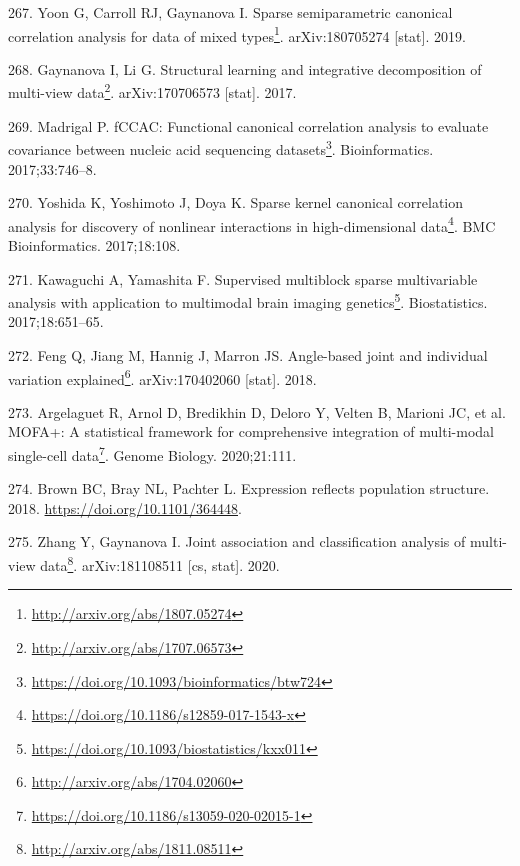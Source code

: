 \documentclass[
  a4paper,
]{book}
\DeclareRobustCommand{\href}[2]{#2\footnote{\url{#1}}}
\newlength{\cslhangindent}
\newlength{\cslentryspacingunit} %
\newenvironment{CSLReferences}[2] %
 {%
  \setlength{\parindent}{0pt}
  \ifodd #1
  \let\oldpar\par
  \def\par{\hangindent=\cslhangindent\oldpar}
  \fi
  \setlength{\parskip}{#2\cslentryspacingunit}
 }%
 {}
\begin{document}
\begin{CSLReferences}{0}{0}
\leavevmode{}%
267. Yoon G, Carroll RJ, Gaynanova I. \href{http://arxiv.org/abs/1807.05274}{Sparse semiparametric canonical correlation analysis for data of mixed types}. arXiv:180705274 {[}stat{]}. 2019.

\leavevmode{}%
268. Gaynanova I, Li G. \href{http://arxiv.org/abs/1707.06573}{Structural learning and integrative decomposition of multi-view data}. arXiv:170706573 {[}stat{]}. 2017.

\leavevmode{}%
269. Madrigal P. \href{https://doi.org/10.1093/bioinformatics/btw724}{fCCAC: Functional canonical correlation analysis to evaluate covariance between nucleic acid sequencing datasets}. Bioinformatics. 2017;33:746--8.

\leavevmode{}%
270. Yoshida K, Yoshimoto J, Doya K. \href{https://doi.org/10.1186/s12859-017-1543-x}{Sparse kernel canonical correlation analysis for discovery of nonlinear interactions in high-dimensional data}. BMC Bioinformatics. 2017;18:108.

\leavevmode{}%
271. Kawaguchi A, Yamashita F. \href{https://doi.org/10.1093/biostatistics/kxx011}{Supervised multiblock sparse multivariable analysis with application to multimodal brain imaging genetics}. Biostatistics. 2017;18:651--65.

\leavevmode{}%
272. Feng Q, Jiang M, Hannig J, Marron JS. \href{http://arxiv.org/abs/1704.02060}{Angle-based joint and individual variation explained}. arXiv:170402060 {[}stat{]}. 2018.

\leavevmode{}%
273. Argelaguet R, Arnol D, Bredikhin D, Deloro Y, Velten B, Marioni JC, et al. \href{https://doi.org/10.1186/s13059-020-02015-1}{MOFA+: A statistical framework for comprehensive integration of multi-modal single-cell data}. Genome Biology. 2020;21:111.

\leavevmode{}%
274. Brown BC, Bray NL, Pachter L. Expression reflects population structure. 2018. \url{https://doi.org/10.1101/364448}.

\leavevmode{}%
275. Zhang Y, Gaynanova I. \href{http://arxiv.org/abs/1811.08511}{Joint association and classification analysis of multi-view data}. arXiv:181108511 {[}cs, stat{]}. 2020.


\end{CSLReferences}
\end{document}
